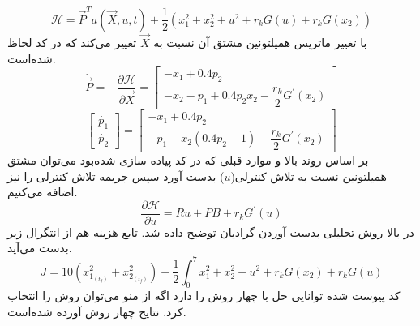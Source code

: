 \documentclass[12 pt]{article}
\begin{document}
$$
\mathcal{H} = \vec{P}^Ta(\vec{X}, u, t) + \frac12\left(x_1^2 + x_2^2 + u^2 + r_kG(u) + r_kG(x_2)\right)
$$
با تغییر ماتریس همیلتونین مشتق آن نسبت به 
$\vec{X}$
 تغییر می‌کند که در کد لحاظ شده‌است.
 $$\dot{\vec{P}} = -\dfrac{\partial \mathcal{H}}{\partial \vec{X}} = \begin{bmatrix}
 	-x_1 + 0.4p_2 \\
 	-x_2  - p_1 + 0.4 p_2x_2 - \dfrac{r_k}{2}G^{\prime}(x_2)
 \end{bmatrix}$$
 $$\begin{bmatrix}
 	\dot{p_1}\\
 	\dot{p_2}
 \end{bmatrix} = \begin{bmatrix}
	-x_1 + 0.4p_2 \\
	  - p_1 + x_2(0.4 p_2-1) - \dfrac{r_k}{2}G^{\prime}(x_2)
\end{bmatrix}$$
بر اساس روند بالا و موارد قبلی که در کد پیاده سازی شده‌بود می‌توان مشتق همیلتونین نسبت به تلاش کنترلی($u$) بدست آورد سپس جریمه تلاش کنترلی را نیز اضافه می‌کنیم.
$$
\dfrac{\partial \mathcal{H}}{\partial u} = Ru + PB + r_kG^{\prime}(u)
$$
در بالا روش تحلیلی بدست آوردن گرادیان توضیح داده شد.
تابع هزینه هم از انتگرال زیر بدست می‌آید.
$$J = 10(x_{1_{(t_f)}}^2 + x_{2_{(t_f)}}^2) +\frac{1}{2}\int_0^7 x_1^2 + x_2^2 + u^2 + r_kG(x_2) + r_kG(u)$$
کد پیوست شده توانایی حل با چهار روش را دارد اگه از منو می‌توان روش را انتخاب کرد. نتایح چهار روش آورده شده‌است.
\newpage
{}
\end{document}
